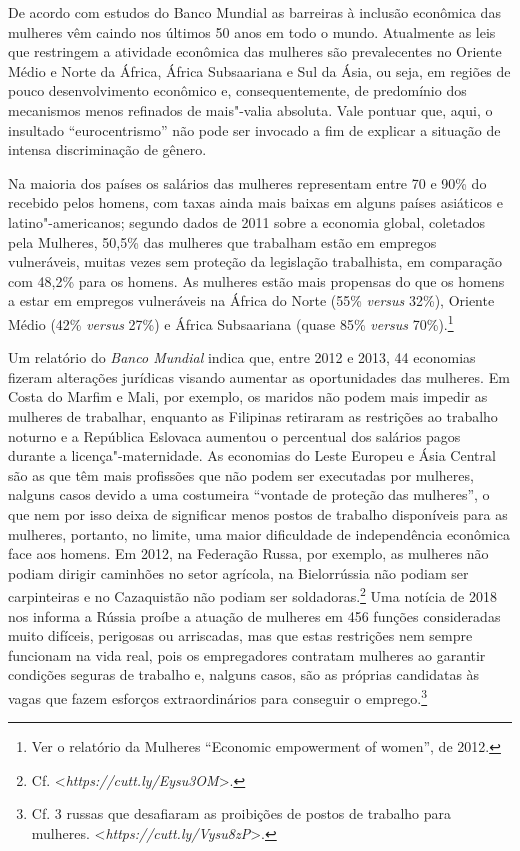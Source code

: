De acordo com estudos do Banco Mundial as barreiras à inclusão econômica
das mulheres vêm caindo nos últimos 50 anos em todo o mundo. Atualmente
as leis que restringem a atividade econômica das mulheres são
prevalecentes no Oriente Médio e Norte da África, África Subsaariana e
Sul da Ásia, ou seja, em regiões de pouco desenvolvimento econômico e,
consequentemente, de predomínio dos mecanismos menos refinados de
mais"-valia absoluta. Vale pontuar que, aqui, o insultado
``eurocentrismo'' não pode ser invocado a fim de explicar a situação de
intensa discriminação de gênero.

Na maioria dos países os salários das mulheres representam entre 70 e
90\% do recebido pelos homens, com taxas ainda mais baixas em alguns
países asiáticos e latino"-americanos; segundo dados de 2011 sobre a
economia global, coletados pela  Mulheres, 50,5\% das mulheres que
trabalham estão em empregos vulneráveis, muitas vezes sem proteção da
legislação trabalhista, em comparação com 48,2\% para os homens. As
mulheres estão mais propensas do que os homens a estar em empregos
vulneráveis ​​na África do Norte (55\% \emph{versus} 32\%), Oriente
Médio (42\% \emph{versus} 27\%) e África Subsaariana (quase 85\%
\emph{versus} 70\%).\footnote{Ver o relatório da  Mulheres ``Economic
  empowerment of women'', de 2012.}

Um relatório do \emph{Banco Mundial} indica que, entre 2012 e 2013, 44
economias fizeram alterações jurídicas visando aumentar as oportunidades
das mulheres. Em Costa do Marfim e Mali, por exemplo, os maridos não
podem mais impedir as mulheres de trabalhar, enquanto as Filipinas
retiraram as restrições ao trabalho noturno e a República Eslovaca
aumentou o percentual dos salários pagos durante a licença"-maternidade.
As economias do Leste Europeu e Ásia Central são as que têm mais
profissões que não podem ser executadas por mulheres, nalguns casos
devido a uma costumeira ``vontade de proteção das mulheres'', o que nem
por isso deixa de significar menos postos de trabalho disponíveis para
as mulheres, portanto, no limite, uma maior dificuldade de independência
econômica face aos homens. Em 2012, na Federação Russa, por exemplo, as
mulheres não podiam dirigir caminhões no setor agrícola, na Bielorrússia
não podiam ser carpinteiras e no Cazaquistão não podiam ser
soldadoras.\footnote{Cf.
  \textless{}\emph{https://cutt.ly/Eysu3OM}\textgreater{}.}
Uma notícia de 2018 nos informa a Rússia proíbe a atuação de mulheres em
456 funções consideradas muito difíceis, perigosas ou arriscadas, mas
que estas restrições nem sempre funcionam na vida real, pois os
empregadores contratam mulheres ao garantir condições seguras de
trabalho e, nalguns casos, são as próprias candidatas às vagas que fazem
esforços extraordinários para conseguir o emprego.\footnote{Cf. 3 russas
  que desafiaram as proibições de postos de trabalho para mulheres.
  \textless{}\emph{https://cutt.ly/Vysu8zP}\textgreater{}.}

